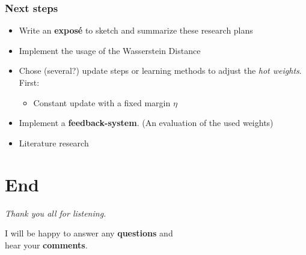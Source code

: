 \begin{frame}
\frametitle{Next steps}
	\begin{itemize}
		\item Write an \textbf{exposé} to sketch and summarize these research plans \newline
		\item Implement the usage of the Wasserstein Distance\newline
		\item Chose (several?) update steps or learning methods to adjust the \textit{hot weights}. First:
		\begin{itemize}
			\item Constant update with a fixed margin $\eta$\newline
		\end{itemize}
		\item Implement a \textbf{feedback-system}. (An evaluation of the used weights) \newline
		\item Literature research
	\end{itemize}	
\end{frame}

\section{End}
\begin{frame}[c]
	\centering %
	\begin{huge}
		\emph{Thank you all for listening.}\\
	\end{huge}
	\vspace{2 cm}
	I will be happy to answer any \textbf{questions} and\\
	hear your \textbf{comments}.
\end{frame}

